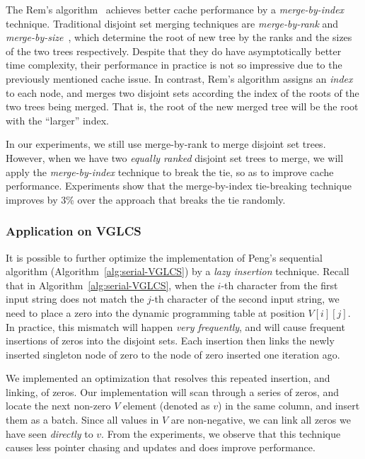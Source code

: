The Rem's algorithm~\cite{dijkstra1976a} achieves better cache
performance by a {\em merge-by-index} technique.  Traditional disjoint
set merging techniques are {\em merge-by-rank} and {\em
merge-by-size}~\cite{Tarjan1975EfficiencyOA}, which determine the root
of new tree by the ranks and the sizes of the two trees respectively.
Despite that they do have asymptotically better time complexity, their
performance in practice is not so impressive due to the previously
mentioned cache issue.  In contrast, Rem's algorithm assigns an {\em
index} to each node, and merges two disjoint sets according the index of
the roots of the two trees being merged.  That is, the root of the new
merged tree will be the root with the ``larger'' index.

In our experiments, we still use merge-by-rank to merge disjoint set
trees.  However, when we have two {\em equally ranked} disjoint set
trees to merge, we will apply the {\em merge-by-index} technique to
break the tie, so as to improve cache performance.  Experiments show
that the merge-by-index tie-breaking technique improves by 3\% over the
approach that breaks the tie randomly.

\subsubsection{Application on VGLCS}


It is possible to further optimize the implementation of Peng's
sequential algorithm (Algorithm~\ref{alg:serial-VGLCS}) by a {\em lazy
insertion} technique.  Recall that in Algorithm~\ref{alg:serial-VGLCS},
when the $i$-th character from the first input string does not match the
$j$-th character of the second input string, we need to place a zero
into the dynamic programming table at position $V[i][j]$.  In practice,
this mismatch will happen {\em very frequently}, and will cause frequent
insertions of zeros into the disjoint sets.  Each insertion then links
the newly inserted singleton node of zero to the node of zero inserted
one iteration ago.

We implemented an optimization that resolves this repeated insertion,
and linking, of zeros.  Our implementation will scan through a series of
zeros, and locate the next non-zero $V$ element (denoted as $v$) in the
same column, and insert them as a batch.  Since all values in $V$ are
non-negative, we can link all zeros we have seen {\em directly} to $v$.
From the experiments, we observe that this technique causes less pointer
chasing and updates and does improve performance.

